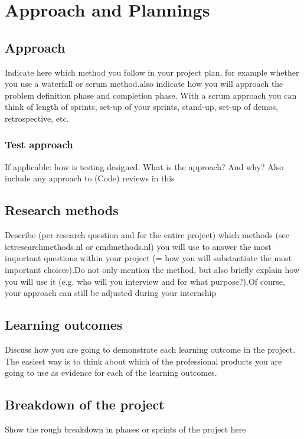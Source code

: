 \documentclass[a4paper, 11pt]{article}
\begin{document}
\section{Approach and Plannings}
\subsection{Approach}
Indicate here which method you follow in your project plan, for example whether you use a waterfall or scrum method.also indicate how you will approach the problem definition phase and completion phase. With a scrum approach you can think of length of sprints, set-up of your sprints, stand-up, set-up of demos, retrospective, etc.
\subsubsection{Test approach}
If applicable: how is testing designed. What is the approach? And why? Also include any approach to (Code) reviews in this
\subsection{Research methods}
Describe (per research question and for the entire project) which methods (see ictresearchmethods.nl or cmdmethods.nl) you will use to answer the most important questions within your project (= how you will substantiate the most important choices).Do not only mention the method, but also briefly explain how you will use it (e.g. who will you interview and for what purpose?).Of course, your approach can still be adjusted during your internship
\subsection{Learning outcomes}
Discuss how you are going to demonstrate each learning outcome in the project. The easiest way is to think about which of the professional products you are going to use as evidence for each of the learning outcomes.
\subsection{Breakdown of the project}
Show the rough breakdown in phases or sprints of the project here
\end{document}
